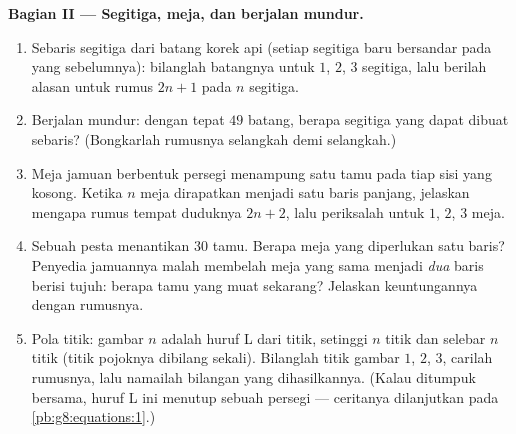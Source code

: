 \begin{problem}
\medskip
\noindent\textbf{Bagian II --- Segitiga, meja, dan berjalan mundur.}
\begin{enumerate}[resume]
  \item Sebaris segitiga dari batang korek api (setiap segitiga baru
        bersandar pada yang sebelumnya): bilanglah batangnya untuk
        $1$, $2$, $3$ segitiga, lalu berilah alasan untuk rumus
        $2n + 1$ pada $n$ segitiga.
  \item Berjalan mundur: dengan tepat $49$ batang, berapa segitiga
        yang dapat dibuat sebaris? (Bongkarlah rumusnya selangkah
        demi selangkah.)
  \item Meja jamuan berbentuk persegi menampung satu tamu pada tiap
        sisi yang kosong. Ketika $n$ meja dirapatkan menjadi satu
        baris panjang, jelaskan mengapa rumus tempat duduknya
        $2n + 2$, lalu periksalah untuk $1$, $2$, $3$ meja.
  \item Sebuah pesta menantikan $30$ tamu. Berapa meja yang
        diperlukan satu baris? Penyedia jamuannya malah membelah meja
        yang sama menjadi \emph{dua} baris berisi tujuh: berapa tamu
        yang muat sekarang? Jelaskan keuntungannya dengan rumusnya.
  \item Pola titik: gambar $n$ adalah huruf L dari titik, setinggi $n$
        titik dan selebar $n$ titik (titik pojoknya dibilang sekali).
        Bilanglah titik gambar $1$, $2$, $3$, carilah rumusnya, lalu
        namailah bilangan yang dihasilkannya. (Kalau ditumpuk
        bersama, huruf L ini menutup sebuah persegi --- ceritanya
        dilanjutkan pada \cref{pb:g8:equations:1}.)
\end{enumerate}


\end{problem}

